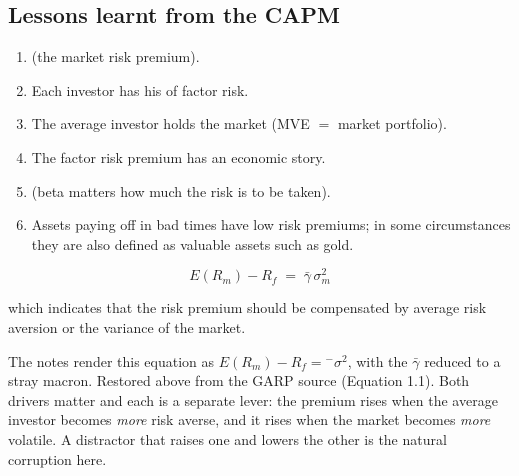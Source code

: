 
\subsection{Lessons learnt from the CAPM}

\begin{enumerate}
\item {} (the market risk premium).
\item Each investor has his  of factor risk.
\item The average investor holds the market (MVE $=$ market portfolio).
\item The factor risk premium has an economic story.
\item {} (beta matters how much the risk is to be taken).
\item Assets paying off in bad times have low risk premiums; in some
circumstances they are also defined as valuable assets such as gold.
\end{enumerate}

\begin{imfmlbox}
\[ E(R_m) - R_f \;=\; \bar{\gamma}\,\sigma_m^{2} \]
\end{imfmlbox}

\noindent which indicates that the risk premium should be compensated by average
risk aversion or the variance of the market.

\begin{imtrapbox}[breakable=false,title={A symbol the source notes lost}]
The notes render this equation as $E(R_m)-R_f = {}^{-}\sigma^2$, with the
$\bar{\gamma}$ reduced to a stray macron. Restored above from the GARP source
(Equation 1.1). Both drivers matter and each is a separate lever: the premium
rises when the average investor becomes \emph{more} risk averse, and it rises
when the market becomes \emph{more} volatile. A distractor that raises one and
lowers the other is the natural corruption here.
\end{imtrapbox}

